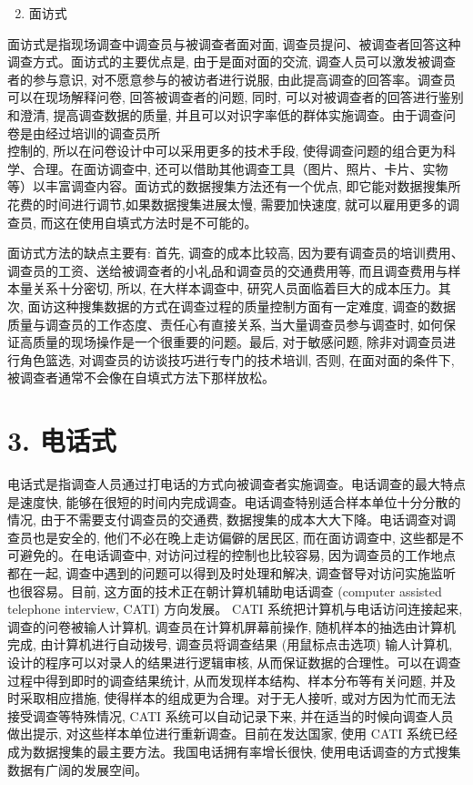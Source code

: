 \documentclass[10pt]{article}
\begin{document}
\begin{CJK*}{UTF8}{bsmi}
\begin{enumerate}
  \setcounter{enumi}{1}
  \item 面访式
\end{enumerate}

面访式是指现场调查中调查员与被调查者面对面, 调查员提问、被调查者回答这种调查方式。面访式的主要优点是, 由于是面对面的交流, 调查人员可以激发被调查者的参与意识, 对不愿意参与的被访者进行说服, 由此提高调查的回答率。调查员可以在现场解释问卷, 回答被调查者的问题, 同时, 可以对被调查者的回答进行鉴别和澄清, 提高调查数据的质量, 并且可以对识字率低的群体实施调查。由于调查问卷是由经过培训的调查员所\\
控制的, 所以在问卷设计中可以采用更多的技术手段, 使得调查问题的组合更为科学、合理。在面访调查中, 还可以借助其他调查工具（图片、照片、卡片、实物等）以丰富调查内容。面访式的数据搜集方法还有一个优点, 即它能对数据搜集所花费的时间进行调节,如果数据搜集进展太慢, 需要加快速度, 就可以雇用更多的调查员, 而这在使用自填式方法时是不可能的。

面访式方法的缺点主要有: 首先, 调查的成本比较高, 因为要有调查员的培训费用、调查员的工资、送给被调查者的小礼品和调查员的交通费用等, 而且调查费用与样本量关系十分密切, 所以, 在大样本调查中, 研究人员面临着巨大的成本压力。其次, 面访这种搜集数据的方式在调查过程的质量控制方面有一定难度, 调查的数据质量与调查员的工作态度、责任心有直接关系, 当大量调查员参与调查时, 如何保证高质量的现场操作是一个很重要的问题。最后, 对于敏感问题, 除非对调查员进行角色篮选, 对调查员的访谈技巧进行专门的技术培训, 否则, 在面对面的条件下, 被调查者通常不会像在自填式方法下那样放松。

\section*{3. 电话式}
电话式是指调查人员通过打电话的方式向被调查者实施调查。电话调查的最大特点是速度快, 能够在很短的时间内完成调查。电话调查特别适合样本单位十分分散的情况, 由于不需要支付调查员的交通费, 数据搜集的成本大大下降。电话调查对调查员也是安全的, 他们不必在晚上走访偏僻的居民区, 而在面访调查中, 这些都是不可避免的。在电话调查中, 对访问过程的控制也比较容易, 因为调查员的工作地点都在一起, 调查中遇到的问题可以得到及时处理和解决, 调查督导对访问实施监听也很容易。目前, 这方面的技术正在朝计算机辅助电话调查 (computer assisted telephone interview, CATI) 方向发展。 CATI 系统把计算机与电话访问连接起来, 调查的问卷被输人计算机, 调查员在计算机屏幕前操作, 随机样本的抽选由计算机完成, 由计算机进行自动拨号, 调查员将调查结果 (用鼠标点击选项) 输人计算机, 设计的程序可以对录人的结果进行逻辑审核, 从而保证数据的合理性。可以在调查过程中得到即时的调查结果统计, 从而发现样本结构、样本分布等有关问题, 并及时采取相应措施, 使得样本的组成更为合理。对于无人接听, 或对方因为忙而无法接受调查等特殊情况, CATI 系统可以自动记录下来, 并在适当的时候向调查人员做出提示, 对这些样本单位进行重新调查。目前在发达国家, 使用 CATI 系统已经成为数据搜集的最主要方法。我国电话拥有率增长很快, 使用电话调查的方式搜集数据有广阔的发展空间。


\end{CJK*}
\end{document}
